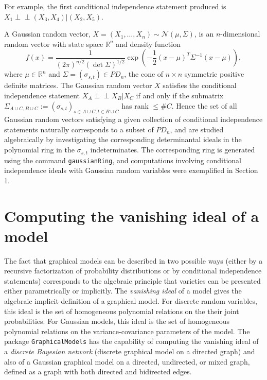 \documentclass[letterpaper]{article}
\theoremstyle{definition}
\def\ci{\perp\!\!\!\perp}
\begin{document}
For example, the first conditional independence statement produced
is $X_{1} \ci (X_{3}, X_{4}) | (X_{2}, X_{5})$.

A Gaussian random vector, $X = (X_{1}, \ldots, X_{n}) 
\sim \mathcal{N}(\mu, \Sigma)$, is an
$n$-dimensional random vector with state space $\mathbb{R}^{n}$ and
density function
$$
f(x)  =  \frac{1}{(2 \pi)^{n/2}(\det \Sigma)^{1/2} } 
\exp\left( - \frac{1}{2} (x- \mu)^{T} \Sigma^{{-1}} (x - \mu) \right), 
$$
where $\mu \in \mathbb{R}^{n}$ and $\Sigma = (\sigma_{s,t}) \in PD_{n}$, the cone of 
$n \times n$ symmetric positive definite matrices.  The Gaussian random vector
$X$ satisfies the conditional independence statement $X_{A} \ci X_{B} | X_{C}$
if and only if the submatrix 
$\Sigma_{A \cup C, B \cup C}  := 
(\sigma_{s,t})_{s \in A \cup C, t \in B \cup C}$ has rank $\leq \#C$.
Hence the set of all Gaussian random vectors satisfying a given
collection of conditional independence statements naturally corresponds
to a subset of $PD_{n}$, and are studied algebraically by investigating  the corresponding determinantal ideals in the polynomial ring
in the $\sigma_{s,t}$ indeterminates.  The corresponding ring
is generated using the command {\tt gaussianRing}, and
computations involving conditional independence ideals with
Gaussian random variables were exemplified in Section 1. 



      



\section{Computing the vanishing ideal of a model}

The fact that graphical models can be described in two possible ways (either by a recursive
factorization of probability distributions or by conditional independence
statements) corresponds to the algebraic principle that varieties can be presented either
parametrically or implicitly. The \emph{vanishing ideal} of a model 
gives the algebraic implicit definition of a graphical model. For discrete
random variables, this ideal is the set 
of homogeneous polynomial relations on the their joint probabilities.   For Gaussian models, this ideal is the set  of homogeneous
polynomial relations on the variance-covariance parameters of the model.
The package {\tt GraphicalModels} has the capability of computing the vanishing ideal
of  a \emph{discrete Bayesian network} (discrete graphical model on a directed
graph) and also of a Gaussian graphical model on a directed, undirected, or  mixed
graph, defined as  a graph with both directed and bidirected edges. 
\end{document}
